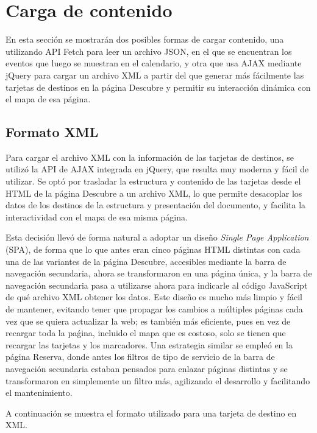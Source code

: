 \documentclass[11pt, a4paper]{book}
\begin{document}
	\section{Carga de contenido}
	En esta sección se mostrarán dos posibles formas de cargar contenido, una utilizando API Fetch para leer un archivo JSON, en el que se encuentran los eventos que luego se muestran en el calendario, y otra que usa AJAX mediante jQuery para cargar un archivo XML a partir del que generar más fácilmente las tarjetas de destinos en la página Descubre y permitir su interacción dinámica con el mapa de esa página.
	\subsection{Formato XML}

    Para cargar el archivo XML con la información de las tarjetas de destinos, se utilizó la API de AJAX integrada en jQuery, que resulta muy moderna y fácil de utilizar. Se optó por trasladar la estructura y contenido de las tarjetas desde el HTML de la página Descubre a un archivo XML, lo que permite desacoplar los datos de los destinos de la estructura y presentación del documento, y facilita la interactividad con el mapa de esa misma página.

    Esta decisión llevó de forma natural a adoptar un diseño \textit{Single Page Application} (SPA), de forma que lo que antes eran cinco páginas HTML distintas con cada una de las variantes de la página Descubre, accesibles mediante la barra de navegación secundaria, ahora se transformaron en una página única, y la barra de navegación secundaria pasa a utilizarse ahora para indicarle al código JavaScript de qué archivo XML obtener los datos. Este diseño es mucho más limpio y fácil de mantener, evitando tener que propagar los cambios a múltiples páginas cada vez que se quiera actualizar la web; es también más eficiente, pues en vez de recargar toda la paǵina, incluido el mapa que es costoso, solo se tienen que recargar las tarjetas y los marcadores. Una estrategia similar se empleó en la página Reserva, donde antes los filtros de tipo de servicio de la barra de navegación secundaria estaban pensados para enlazar páginas distintas y se transformaron en simplemente un filtro más, agilizando el desarrollo y facilitando el mantenimiento.

    A continuación se muestra el formato utilizado para una tarjeta de destino en XML.
\end{document}
